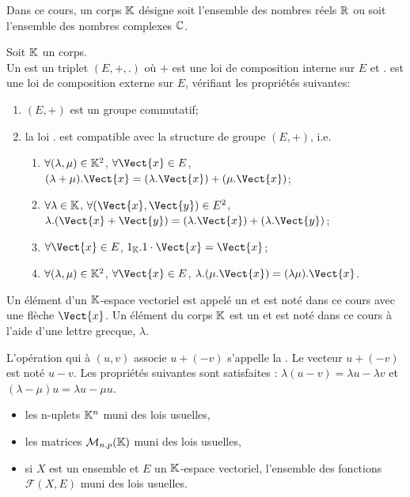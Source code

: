 \documentclass{book}
\begin{document}
Dans ce cours, un corps $\mathbb{K}$ désigne soit l'ensemble des nombres réels $\mathbb{R}$ ou soit l'ensemble des nombres complexes $\mathbb{C}$. 

\begin{Definition}
Soit $\mathbb{K}$ un corps.\\
Un  est un triplet $(E,+,.)$ où
$+$ est une loi de composition interne sur $E$ et
$.$ est une loi de composition externe sur $E$,
vérifiant les propriétés suivantes:
\begin{enumerate}
\item $(E, +)$ est un groupe commutatif;
\item la loi $.$ est compatible avec la structure de groupe $(E, +)$, i.e.  
 \begin{enumerate}
  \item $\forall(\lambda ,\mu )\in\mathbb{K}^2$, $\forall \Vect{x}\in E$, $(\lambda +\mu ) . \Vect{x} = (\lambda . \Vect{x}) + (\mu . \Vect{x})$;
  \item $\forall\lambda \in\mathbb{K}$, $\forall(\Vect{x},\Vect{y})\in E^2$, $\lambda . (\Vect{x}+\Vect{y}) = (\lambda . \Vect{x}) + (\lambda . \Vect{y})$;
  \item $\forall\Vect{x}\in E$, $1_\K. 1\cdot\Vect{x} = \Vect{x}$;
  \item $\forall(\lambda ,\mu )\in\mathbb{K}^2$, $\forall\Vect{x}\in E$, $\lambda . (\mu . \Vect{x}) = (\lambda \mu ) . \Vect{x}$.
  \end{enumerate}
\end{enumerate}
Un élément d'un $\mathbb{K}$-espace vectoriel est appelé un  et est noté dans ce cours avec une flèche  $\Vect{x}$. Un élément du corps $\mathbb{K}$ est un  et est noté dans ce cours à l'aide d'une lettre grecque, $\lambda$.   
\end{Definition}
\begin{Vocabulaire}
L'opération qui à $(u,v)$ associe $u+(-v)$ s'appelle la .
 Le vecteur $u+(-v)$ est noté $u-v$.
 Les propriétés suivantes sont satisfaites : $\lambda (u-v)=\lambda u -\lambda v$
 et $(\lambda -\mu)u=\lambda u-\mu u$.
\end{Vocabulaire}


\begin{Exemple}

\begin{itemize}
\item les n-uplets $\mathbb{K}^n$ muni des lois usuelles, 
\item
  les matrices $\mathcal{M}_{n,p}(\mathbb{K})$ muni des lois usuelles,
\item
 si $X$ est un ensemble et $E$ un $\mathbb{K}$-espace vectoriel, l'ensemble des fonctions $\mathcal{F}(X,E)$ muni des lois usuelles.
\end{itemize}
\end{Exemple}
\end{document}
